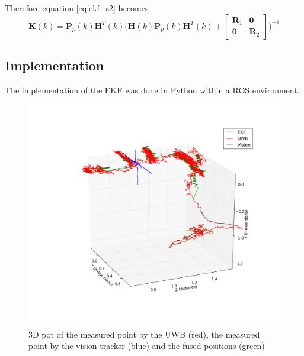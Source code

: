 Therefore equation \ref{eq:ekf_s2} becomes
$$\textbf{K}(k) = \textbf{P}_p(k) \textbf{H}^T(k) \Big( \textbf{H}(k) \textbf{P}_p(k) \textbf{H}^T(k) + \begin{bmatrix}
	\textbf{R}_1 & \textbf{0}\\
	\textbf{0} &\textbf{R}_2
\end{bmatrix} \Big)^{-1}$$

\subsection{Implementation}
The implementation of the EKF was done in Python within a ROS environment.

\begin{figure}[ht!]\centering
	\includegraphics[width=1.0\textwidth]{figures/state_track}
	\caption{3D pot of the measured point by the UWB (red), the measured point by the vision tracker (blue) and the fused positions (green)}\label{fig:statetrack}
\end{figure}
